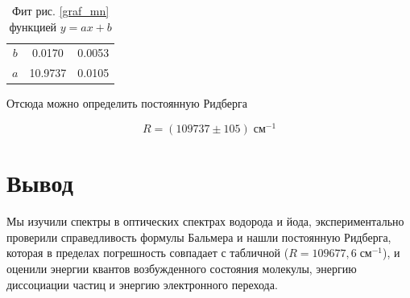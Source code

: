 \documentclass[a4paper, 12pt]{article}%
\begin{document}
	\begin{table}[!h]
		\begin{center}
			\begin{tabular}{|c|c|c|}
				\hline
				& \text{Значение} & \text{Погрешность} \\
				\hline
				 $ b $ & 0.0170 & 0.0053 \\
\hline				
$ a $& 10.9737 & 0.0105 \\
				\hline 
			\end{tabular} 
		\end{center}
		\caption{Фит рис. \ref{graf_mn} функцией $ y = ax +b $}
	\end{table}

\newpage

	Отсюда можно определить постоянную Ридберга 
	
\begin{equation}\label{}
	R = (109737 \pm 105) \; \text{см}^{-1} 
\end{equation}
	
	\section{Вывод }
	
	Мы изучили спектры в оптических спектрах водорода и йода, экспериментально проверили справедливость формулы Бальмера и нашли постоянную Ридберга, которая в пределах погрешность совпадает с табличной ($ R = 109 677,6 \; \text{см}^{-1} $), и оценили энергии квантов возбужденного состояния молекулы, энергию диссоциации частиц и энергию электронного перехода.
\end{document}
